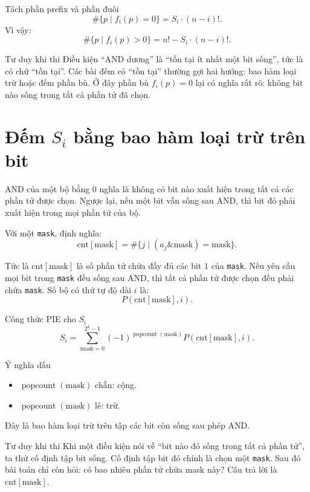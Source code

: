 \documentclass[12pt]{article}
\newcommand{\popc}{\operatorname{popcount}}
\newcommand{\cnt}{\mathrm{cnt}}
\newcommand{\msk}{\mathrm{mask}}
\begin{document}
\begin{resultbox}{Tách phần prefix và phần đuôi}
\[
\#\{p\mid f_i(p)=0\}=S_i\cdot (n-i)!.
\]
Vì vậy:
\[
\#\{p\mid f_i(p)>0\}
=
n!-S_i\cdot(n-i)!.
\]
\end{resultbox}

\begin{thinkbox}{Tư duy khi thi}
Điều kiện ``AND dương'' là ``tồn tại ít nhất một bit sống'', tức là có chữ ``tồn tại''. Các bài đếm có ``tồn tại'' thường gợi hai hướng: bao hàm loại trừ hoặc đếm phần bù. Ở đây phần bù \(f_i(p)=0\) lại có nghĩa rất rõ: không bit nào sống trong tất cả phần tử đã chọn.
\end{thinkbox}

\section{\texorpdfstring{Đếm \(S_i\) bằng bao hàm loại trừ trên bit}{Đếm Si bằng bao hàm loại trừ trên bit}}

AND của một bộ bằng \(0\) nghĩa là không có bit nào xuất hiện trong tất cả các phần tử được chọn. Ngược lại, nếu một bit vẫn sống sau AND, thì bit đó phải xuất hiện trong mọi phần tử của bộ.

Với một \texttt{mask}, định nghĩa:
\[
\cnt[\msk]=\#\{j\mid (a_j\mathbin{\&}\msk)=\msk\}.
\]

Tức là \(\cnt[\msk]\) là số phần tử chứa đầy đủ các bit \(1\) của \texttt{mask}. Nếu yêu cầu mọi bit trong \texttt{mask} đều sống sau AND, thì tất cả phần tử được chọn đều phải chứa \texttt{mask}. Số bộ có thứ tự độ dài \(i\) là:
\[
P(\cnt[\msk],i).
\]

\begin{resultbox}{Công thức PIE cho \(S_i\)}
\[
S_i=
\sum_{\msk=0}^{2^k-1}
(-1)^{\popc(\msk)}P(\cnt[\msk],i).
\]
\end{resultbox}

\begin{notebox}{Ý nghĩa dấu}
\begin{itemize}
    \item \(\popc(\msk)\) chẵn: cộng.
    \item \(\popc(\msk)\) lẻ: trừ.
\end{itemize}
Đây là bao hàm loại trừ trên tập các bit còn sống sau phép AND.
\end{notebox}

\begin{thinkbox}{Tư duy khi thi}
Khi một điều kiện nói về ``bit nào đó sống trong tất cả phần tử'', ta thử cố định tập bit sống. Cố định tập bit đó chính là chọn một \texttt{mask}. Sau đó bài toán chỉ còn hỏi: có bao nhiêu phần tử chứa mask này? Câu trả lời là \(\cnt[\msk]\).
\end{thinkbox}
\end{document}
